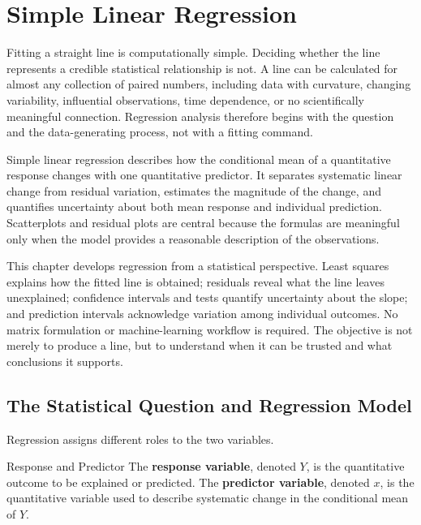 \chapter{Simple Linear Regression}
\label{ch:linear-regression}

Fitting a straight line is computationally simple. Deciding whether the line represents a credible statistical relationship is not. A line can be calculated for almost any collection of paired numbers, including data with curvature, changing variability, influential observations, time dependence, or no scientifically meaningful connection. Regression analysis therefore begins with the question and the data-generating process, not with a fitting command.

Simple linear regression describes how the conditional mean of a quantitative response changes with one quantitative predictor. It separates systematic linear change from residual variation, estimates the magnitude of the change, and quantifies uncertainty about both mean response and individual prediction. Scatterplots and residual plots are central because the formulas are meaningful only when the model provides a reasonable description of the observations.

This chapter develops regression from a statistical perspective. Least squares explains how the fitted line is obtained; residuals reveal what the line leaves unexplained; confidence intervals and tests quantify uncertainty about the slope; and prediction intervals acknowledge variation among individual outcomes. No matrix formulation or machine-learning workflow is required. The objective is not merely to produce a line, but to understand when it can be trusted and what conclusions it supports.

\section{The Statistical Question and Regression Model}
\label{sec:regression-question-model}

Regression assigns different roles to the two variables.

\begin{definition}{Response and Predictor}
The \textbf{response variable}, denoted $Y$, is the quantitative outcome to be explained or predicted. The \textbf{predictor variable}, denoted $x$, is the quantitative variable used to describe systematic change in the conditional mean of $Y$.
\end{definition}


